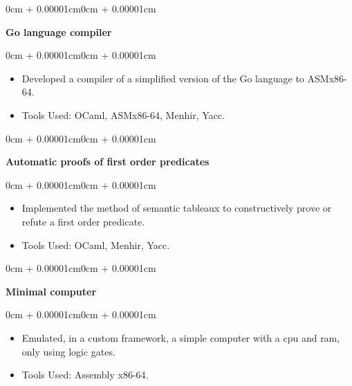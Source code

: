 \documentclass[10pt, letterpaper]{article}
\newenvironment{highlights}{
    \begin{itemize}[
        topsep=0.10cm,
        parsep=0.10cm,
        partopsep=0pt,
        itemsep=0pt,
        leftmargin=0cm + 10pt
    ]
}{
    \end{itemize}
}
\newenvironment{onecolentry}{
    \begin{adjustwidth}{0cm + 0.00001cm}{0cm + 0.00001cm}
}{
    \end{adjustwidth}
}
\begin{document}
\begin{onecolentry}
    \textbf{Go language compiler}
\end{onecolentry}

\vspace{0.10cm}
\begin{onecolentry}
    \begin{highlights}
        \item Developed a compiler of a simplified version of the Go language to ASMx86-64.
        \item Tools Used: OCaml, ASMx86-64, Menhir, Yacc.
    \end{highlights}
\end{onecolentry}

\vspace{0.2cm}

\begin{onecolentry}
    \textbf{Automatic proofs of first order predicates}
\end{onecolentry}

\vspace{0.10cm}
\begin{onecolentry}
    \begin{highlights}
        \item Implemented the method of semantic tableaux to constructively prove or refute a first order predicate.
        \item Tools Used: OCaml, Menhir, Yacc.
    \end{highlights}
\end{onecolentry}

\vspace{0.2cm}

\begin{onecolentry}
    \textbf{Minimal computer}
\end{onecolentry}

\vspace{0.10cm}
\begin{onecolentry}
    \begin{highlights}
        \item Emulated, in a custom framework, a simple computer with a cpu and ram, only using logic gates.
        \item Tools Used: Assembly x86-64.
    \end{highlights}
\end{onecolentry}

\vspace{0.2cm}
\end{document}
